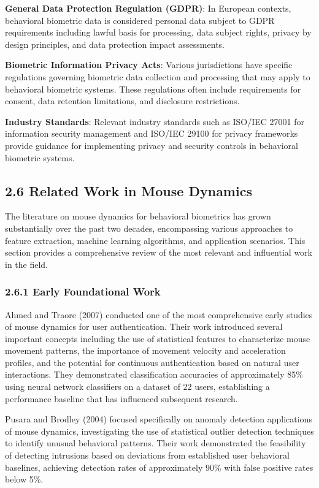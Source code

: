\documentclass[
  11pt,
  a4paper,
]{article}
\begin{document}
\textbf{General Data Protection Regulation (GDPR)}: In European
contexts, behavioral biometric data is considered personal data subject
to GDPR requirements including lawful basis for processing, data subject
rights, privacy by design principles, and data protection impact
assessments.

\textbf{Biometric Information Privacy Acts}: Various jurisdictions have
specific regulations governing biometric data collection and processing
that may apply to behavioral biometric systems. These regulations often
include requirements for consent, data retention limitations, and
disclosure restrictions.

\textbf{Industry Standards}: Relevant industry standards such as ISO/IEC
27001 for information security management and ISO/IEC 29100 for privacy
frameworks provide guidance for implementing privacy and security
controls in behavioral biometric systems.

\subsection{2.6 Related Work in Mouse
Dynamics}\label{related-work-in-mouse-dynamics}

The literature on mouse dynamics for behavioral biometrics has grown
substantially over the past two decades, encompassing various approaches
to feature extraction, machine learning algorithms, and application
scenarios. This section provides a comprehensive review of the most
relevant and influential work in the field.

\subsubsection{2.6.1 Early Foundational
Work}\label{early-foundational-work}

Ahmed and Traore (2007) conducted one of the most comprehensive early
studies of mouse dynamics for user authentication. Their work introduced
several important concepts including the use of statistical features to
characterize mouse movement patterns, the importance of movement
velocity and acceleration profiles, and the potential for continuous
authentication based on natural user interactions. They demonstrated
classification accuracies of approximately 85\% using neural network
classifiers on a dataset of 22 users, establishing a performance
baseline that has influenced subsequent research.

Pusara and Brodley (2004) focused specifically on anomaly detection
applications of mouse dynamics, investigating the use of statistical
outlier detection techniques to identify unusual behavioral patterns.
Their work demonstrated the feasibility of detecting intrusions based on
deviations from established user behavioral baselines, achieving
detection rates of approximately 90\% with false positive rates below
5\%.
\end{document}
